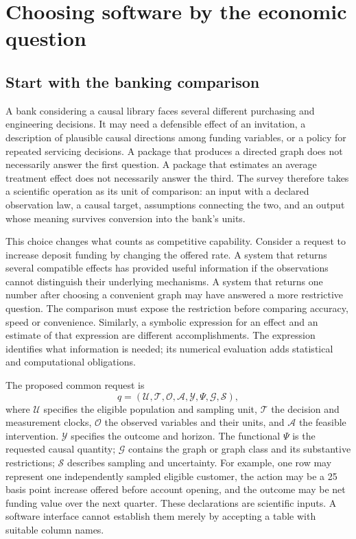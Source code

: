 \chapter{Choosing software by the economic question}
\label{exec13:survey}

\section{Start with the banking comparison}

A bank considering a causal library faces several different purchasing and
engineering decisions. It may need a defensible effect of an invitation, a
description of plausible causal directions among funding variables, or a
policy for repeated servicing decisions. A package that produces a directed
graph does not necessarily answer the first question. A package that estimates
an average treatment effect does not necessarily answer the third. The survey
therefore takes a scientific operation as its unit of comparison: an input
with a declared observation law, a causal target, assumptions connecting the
two, and an output whose meaning survives conversion into the bank's units.

This choice changes what counts as competitive capability. Consider a request
to increase deposit funding by changing the offered rate. A system that
returns several compatible effects has provided useful information if the
observations cannot distinguish their underlying mechanisms. A system that
returns one number after choosing a convenient graph may have answered a
more restrictive question. The comparison must expose the restriction before
comparing accuracy, speed or convenience. Similarly, a symbolic expression
for an effect and an estimate of that expression are different accomplishments.
The expression identifies what information is needed; its numerical evaluation
adds statistical and computational obligations.

The proposed common request is
\begin{equation}
 q=(\mathcal U,\mathcal T,\mathcal O,\mathcal A,\mathcal Y,
       \Psi,\mathcal G,\mathcal S),
 \label{exec13:request}
\end{equation}
where $\mathcal U$ specifies the eligible population and sampling unit,
$\mathcal T$ the decision and measurement clocks, $\mathcal O$ the observed
variables and their units, and $\mathcal A$ the feasible intervention.
$\mathcal Y$ specifies the outcome and horizon. The functional $\Psi$ is the
requested causal quantity; $\mathcal G$ contains the graph or graph class and
its substantive restrictions; $\mathcal S$ describes sampling and uncertainty.
For example, one row may represent one independently sampled eligible
customer, the action may be a 25 basis point increase offered before account
opening, and the outcome may be net funding value over the next quarter.
These declarations are scientific inputs. A software interface cannot establish
them merely by accepting a table with suitable column names.

